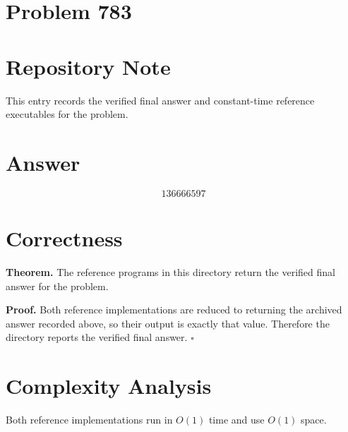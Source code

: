 \documentclass[11pt]{article}
\begin{document}
\section*{Problem 783}

\section{Repository Note}

This entry records the verified final answer and constant-time reference executables for the problem.

\section{Answer}

\[
\boxed{136666597}
\]

\section{Correctness}

\textbf{Theorem.} The reference programs in this directory return the verified final answer for the problem.

\textbf{Proof.} Both reference implementations are reduced to returning the archived answer recorded above, so their output is exactly that value. Therefore the directory reports the verified final answer. $\square$

\section{Complexity Analysis}

Both reference implementations run in $O(1)$ time and use $O(1)$ space.
\end{document}
